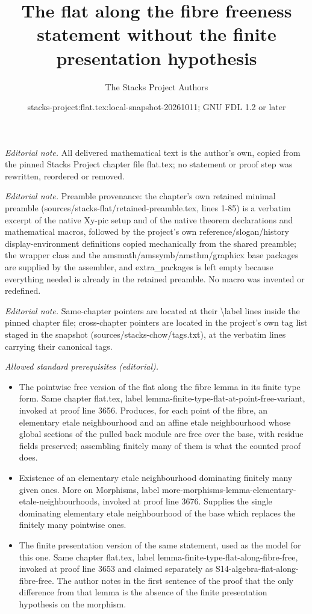 \documentclass[10pt,a4paper]{amsart}
\title{The flat along the fibre freeness statement without the finite presentation hypothesis}
\author{The Stacks Project Authors}
\date{stacks-project:flat.tex:local-snapshot-20261011; GNU FDL 1.2 or later}
\theoremstyle{plain}
\theoremstyle{definition}
\theoremstyle{remark}
\numberwithin{equation}{subsection}
\begin{document}
\maketitle
\noindent\textit{Editorial note.} All delivered mathematical text is the author's own, copied from the pinned Stacks Project chapter file flat.tex; no statement or proof step was rewritten, reordered or removed.\par\medskip
\noindent\textit{Editorial note.} Preamble provenance: the chapter's own retained minimal preamble (sources/stacks-flat/retained-preamble.tex, lines 1-85) is a verbatim excerpt of the native Xy-pic setup and of the native theorem declarations and mathematical macros, followed by the project's own reference/slogan/history display-environment definitions copied mechanically from the shared preamble; the wrapper class and the amsmath/amssymb/amsthm/graphicx base packages are supplied by the assembler, and extra\_packages is left empty because everything needed is already in the retained preamble. No macro was invented or redefined.\par\medskip
\noindent\textit{Editorial note.} Same-chapter pointers are located at their \textbackslash{}label lines inside the pinned chapter file; cross-chapter pointers are located in the project's own tag list staged in the snapshot (sources/stacks-chow/tags.txt), at the verbatim lines carrying their canonical tags.\par\medskip
\noindent\textit{Allowed standard prerequisites (editorial).}\begin{itemize}
\item The pointwise free version of the flat along the fibre lemma in its finite type form. Same chapter flat.tex, label lemma-finite-type-flat-at-point-free-variant, invoked at proof line 3656. Produces, for each point of the fibre, an elementary etale neighbourhood and an affine etale neighbourhood whose global sections of the pulled back module are free over the base, with residue fields preserved; assembling finitely many of them is what the counted proof does.
\item Existence of an elementary etale neighbourhood dominating finitely many given ones. More on Morphisms, label more-morphisms-lemma-elementary-etale-neighbourhoods, invoked at proof line 3676. Supplies the single dominating elementary etale neighbourhood of the base which replaces the finitely many pointwise ones.
\item The finite presentation version of the same statement, used as the model for this one. Same chapter flat.tex, label lemma-finite-type-flat-along-fibre-free, invoked at proof line 3653 and claimed separately as S14-algebra-flat-along-fibre-free. The author notes in the first sentence of the proof that the only difference from that lemma is the absence of the finite presentation hypothesis on the morphism.
\end{itemize}\medskip
\end{document}
